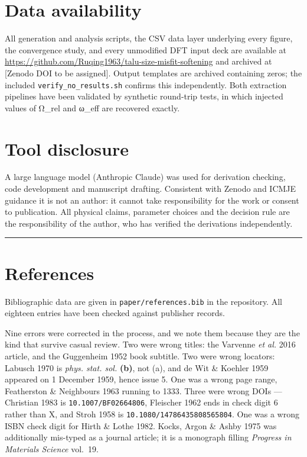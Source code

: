 \hypertarget{data-availability}{%
\section*{Data availability}\label{sec:data-availability}}

All generation and analysis scripts, the CSV data layer underlying every figure, the convergence study, and every unmodified DFT input deck are available at \url{https://github.com/Ruqing1963/talu-size-misfit-softening} and archived at {[}Zenodo DOI to be assigned{]}. Output templates are archived containing zeros; the included \texttt{verify\_no\_results.sh} confirms this independently. Both extraction pipelines have been validated by synthetic round-trip tests, in which injected values of Ω\_rel and ω\_eff are recovered exactly.

\hypertarget{tool-disclosure}{%
\section*{Tool disclosure}\label{sec:tool-disclosure}}

A large language model (Anthropic Claude) was used for derivation checking, code development and manuscript drafting. Consistent with Zenodo and ICMJE guidance it is not an author: it cannot take responsibility for the work or consent to publication. All physical claims, parameter choices and the decision rule are the responsibility of the author, who has verified the derivations independently.

\begin{center}\rule{0.5\linewidth}{0.5pt}\end{center}

\hypertarget{references}{%
\section*{References}\label{sec:references}}

Bibliographic data are given in \texttt{paper/references.bib} in the repository. All
eighteen entries have been checked against publisher records.

Nine errors were corrected in the process, and we note them because they are
the kind that survive casual review. Two were wrong titles: the Varvenne
\emph{et al.} 2016 article, and the Guggenheim 1952 book subtitle. Two were wrong
locators: Labusch 1970 is \emph{phys. stat. sol.} \textbf{(b)}, not (a), and de Wit \&
Koehler 1959 appeared on 1 December 1959, hence issue 5. One was a wrong page
range, Featherston \& Neighbours 1963 running to 1333. Three were wrong DOIs ---
Christian 1983 is \texttt{10.1007/BF02664806}, Fleischer 1962 ends in check digit 6
rather than X, and Stroh 1958 is \texttt{10.1080/14786435808565804}. One was a wrong
ISBN check digit for Hirth \& Lothe 1982. Kocks, Argon \& Ashby 1975 was
additionally mis-typed as a journal article; it is a monograph filling
\emph{Progress in Materials Science} vol.~19.


